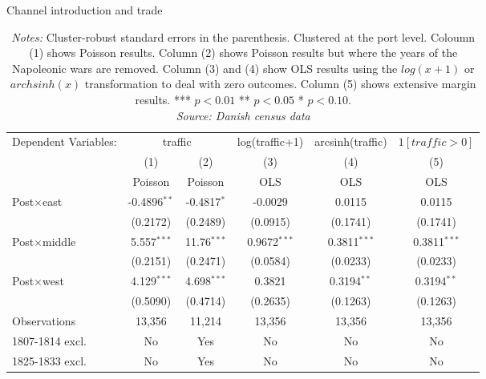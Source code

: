 \begin{table}
\centering
\caption{\label{tab:reg_trade} Channel introduction and trade}
\begin{tabular}{lccccc}
   \tabularnewline \midrule \midrule
   Dependent Variables: & \multicolumn{2}{c}{traffic}     & log(traffic+1)  & arcsinh(traffic)  & $1[traffic>0]$\\
                        & (1)            & (2)            & (3)             & (4)             & (5)\\  
                        & Poisson        & Poisson        & OLS             & OLS             & OLS\\  
   \midrule
   Post$\times$east     & -0.4896$^{**}$ & -0.4817$^{*}$  & -0.0029         & 0.0115          & 0.0115\\   
                        & (0.2172)       & (0.2489)       & (0.0915)        & (0.1741)        & (0.1741)\\   
   Post$\times$middle   & 5.557$^{***}$  & 11.76$^{***}$  & 0.9672$^{***}$  & 0.3811$^{***}$  & 0.3811$^{***}$\\   
                        & (0.2151)       & (0.2471)       & (0.0584)        & (0.0233)        & (0.0233)\\   
   Post$\times$west     & 4.129$^{***}$  & 4.698$^{***}$  & 0.3821          & 0.3194$^{**}$   & 0.3194$^{**}$\\   
                        & (0.5090)       & (0.4714)       & (0.2635)        & (0.1263)        & (0.1263)\\   
   \midrule
   Observations         & 13,356         & 11,214         & 13,356          & 13,356          & 13,356\\  
   \midrule
   1807-1814 excl.      & No             & Yes            & No              & No              & No\\
   1825-1833 excl.      & No             & Yes            & No              & No              & No\\
   \midrule \midrule
\end{tabular}
\parbox{0.9\textwidth}{
\caption*{\textit{Notes:} Cluster-robust standard errors in the parenthesis. Clustered at the port level. Coloumn (1) shows Poisson results. Column (2) shows Poisson results but where the years of the Napoleonic wars are removed. Column (3) and (4) show OLS results using the $log(x+1)$ or $archsinh(x)$ transformation to deal with zero outcomes. Column (5) shows extensive margin results. *** $p< 0.01$ ** $p< 0.05$ * $p< 0.10$. \\ \textit{Source: Danish census data}}
}
\end{table}

